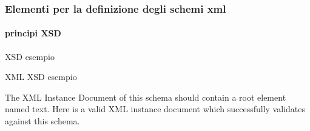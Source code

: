 \begin{frame}
    \frametitle{Elementi per la definizione degli schemi xml}
    \framesubtitle{principi XSD}
    \addtocounter{nframe}{1}




    \begin{block}{XSD esempio}
        {\xsdfirst}
    \end{block}

    \begin{block}{XML XSD esempio}
        
        The XML Instance Document of this schema should contain a root element named text. Here is a valid XML instance document which successfully validates against this schema.
        {\xmlfirst}

    \end{block}
    
\end{frame}







